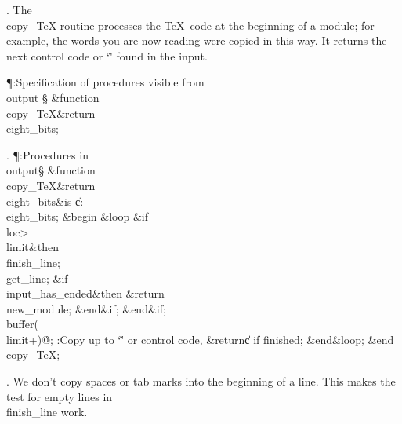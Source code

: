 . The \\{copy\_TeX} routine processes the \TeX\ code at the beginning of a
module; for example, the words you are now reading were copied in this
way. It returns the next control code or `\v' found in the input.

\Y\P\?\4:Specification of procedures visible from \\{output}\X\mathrel{+}%
\S\?\6
\&{function}\8\1\\{copy\_TeX}\?\8\&{return}\?\8\\{eight\_bits}\2;\par
\fi

. \P\?:Procedures in \\{output}\X\mathrel{+}\S\?\6
\&{function}\8\1\\{copy\_TeX}\?\8\&{return}\?\8\\{eight\_bits}\2\8\&{is}\8%
\1\6
\|c\?:\?\\{eight\_bits};\6
\4\&{begin}\6
\1\&{loop}\6
\&{if}\1\1\8\\{loc}\?>\?\\{limit}\2\8\&{then}\6
\\{finish\_line};\5
\\{get\_line};\6
\&{if}\1\1\8\\{input\_has\_ended}\2\8\&{then}\6
\?\&{return}\?\8\\{new\_module};\2\6
\&{end}\8\2\&{if}\1;\2\6
\&{end}\8\2\&{if}\1;\6
\\{buffer}\?\1(\?\\{limit}\?+\?\2)\K\?\H{@};\6
:Copy up to `\v' or control code, \?\&{return}\?\8\|c if finished\X;\2\6
\&{end}\8\&{loop};\2\6
\&{end}\8\\{copy\_TeX};\par
\fi

. We don't copy spaces or tab marks into the beginning of a line. This
makes the test for empty lines in \\{finish\_line} work.

